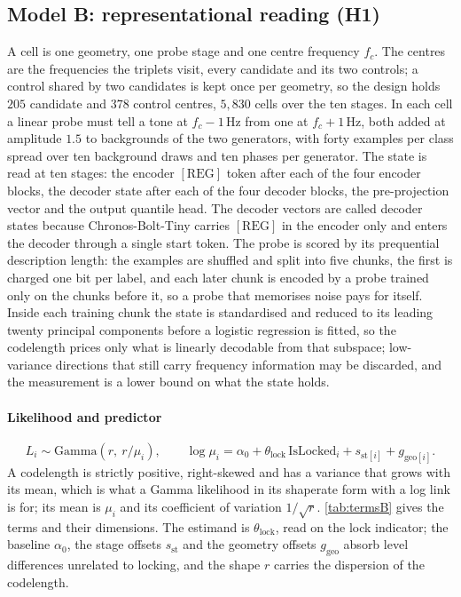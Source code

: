 \subsection{Model {B}: representational reading (H1)}

A cell is one geometry, one probe stage and one centre frequency $f_c$. The centres are the frequencies the triplets visit, every candidate and its two controls; a control shared by two candidates is kept once per geometry, so the design holds $205$ candidate and $378$ control centres, $5{,}830$ cells over the ten stages. In each cell a linear probe must tell a tone at $f_c-1$\,Hz from one at $f_c+1$\,Hz, both added at amplitude $1.5$ to backgrounds of the two generators, with forty examples per class spread over ten background draws and ten phases per generator. The state is read at ten stages: the encoder $[\mathrm{REG}]$ token after each of the four encoder blocks, the decoder state after each of the four decoder blocks, the pre-projection vector and the output quantile head. The decoder vectors are called decoder states because Chronos-Bolt-Tiny carries $[\mathrm{REG}]$ in the encoder only and enters the decoder through a single start token. The probe is scored by its prequential description length\autocite{voitaInformationTheoreticProbingMinimum2020}: the examples are shuffled and split into five chunks, the first is charged one bit per label, and each later chunk is encoded by a probe trained only on the chunks before it, so a probe that memorises noise pays for itself. Inside each training chunk the state is standardised and reduced to its leading twenty principal components before a logistic regression is fitted, so the codelength prices only what is linearly decodable from that subspace; low-variance directions that still carry frequency information may be discarded, and the measurement is a lower bound on what the state holds.

\paragraph{Likelihood and predictor}
\begin{equation*}
L_i \sim \text{Gamma}\!\left(r,\ r/\mu_i\right),
\qquad
\log \mu_i = \alpha_0 + \theta_{\mathrm{lock}}\,\mathrm{IsLocked}_i + s_{\text{st}[i]} + g_{\text{geo}[i]}.
\end{equation*}
A codelength is strictly positive, right-skewed and has a variance that grows with its mean, which is what a Gamma likelihood in its shape\textendash{}rate form with a log link is for; its mean is $\mu_i$ and its coefficient of variation $1/\sqrt r$\@. \autoref{tab:termsB} gives the terms and their dimensions. The estimand is $\theta_{\mathrm{lock}}$, read on the lock indicator; the baseline $\alpha_0$, the stage offsets $s_{\text{st}}$ and the geometry offsets $g_{\text{geo}}$ absorb level differences unrelated to locking, and the shape $r$ carries the dispersion of the codelength.

